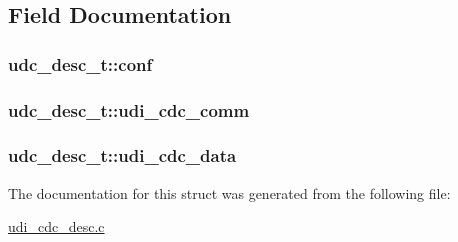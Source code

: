 \subsection{\-Field \-Documentation}
\hypertarget{structudc__desc__t_ad10c40160370f9b60fe6ae7a2b9343e4}{
\subsubsection[{conf}]{ {\bf udc\-\_\-desc\-\_\-t\-::conf}}}
\label{structudc__desc__t_ad10c40160370f9b60fe6ae7a2b9343e4}
\hypertarget{structudc__desc__t_a6c35719c554e3b95bc117b00b4bc4277}{
\subsubsection[{udi\-\_\-cdc\-\_\-comm}]{ {\bf udc\-\_\-desc\-\_\-t\-::udi\-\_\-cdc\-\_\-comm}}}
\label{structudc__desc__t_a6c35719c554e3b95bc117b00b4bc4277}
\hypertarget{structudc__desc__t_a67fedcdbe3d977511fa64bfab415c15f}{
\subsubsection[{udi\-\_\-cdc\-\_\-data}]{ {\bf udc\-\_\-desc\-\_\-t\-::udi\-\_\-cdc\-\_\-data}}}
\label{structudc__desc__t_a67fedcdbe3d977511fa64bfab415c15f}


\-The documentation for this struct was generated from the following file\-:\begin{DoxyCompactItemize}
\item 
\hyperlink{udi__cdc__desc_8c}{udi\-\_\-cdc\-\_\-desc.\-c}\end{DoxyCompactItemize}
